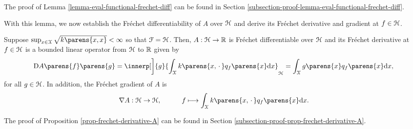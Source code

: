 The proof of Lemma \ref{lemma-eval-functional-frechet-diff} can be found in Section \ref{subsection-proof-lemma-eval-functional-frechet-diff}. 

With this lemma, we now establish the Fr{\'e}chet differentiability of $A$ over $\mathcal{H}$ and derive its Fr{\'e}chet derivative and gradient at $f \in \mathcal{H}$. 

\begin{proposition}\label{prop-frechet-derivative-A}
	Suppose $\sup_{x \in \calX} \sqrt{k \parens{x, x}} < \infty$ so that $\mathcal{F} = \mathcal{H}$. Then, $A: \mathcal{H} \to \mathbb{R}$ is Fr{\'e}chet differentiable over $\mathcal{H}$ and its Fr{\'e}chet derivative at $f \in \mathcal{H}$ is a bounded linear operator from $\mathcal{H}$ to $\mathbb{R}$ given by 
	\begin{align}\label{eq-frechet-derivative-A}
		\Diff A \parens{f} \parens{g} = \innerp[\bigg]{g}{\int_{\calX} k \parens{x, \,\cdot\,} q_f \parens{x} \diff x}_{\calH} = \int_{\calX} g \parens{x} q_f \parens{x} \diff x, 
	\end{align}
	for all $g \in \mathcal{H}$. In addition, the Fr{\'e}chet gradient of $A$ is 
	\begin{align*}
		\nabla A: \calH \to \calH, \quad \qquad f \longmapsto \int_{\calX} k \parens{x, \,\cdot\,} q_f \parens{x} \diff x. 
	\end{align*}
\end{proposition}

The proof of Proposition \ref{prop-frechet-derivative-A} can be found in Section \ref{subsection-proof-prop-frechet-derivative-A}. 

